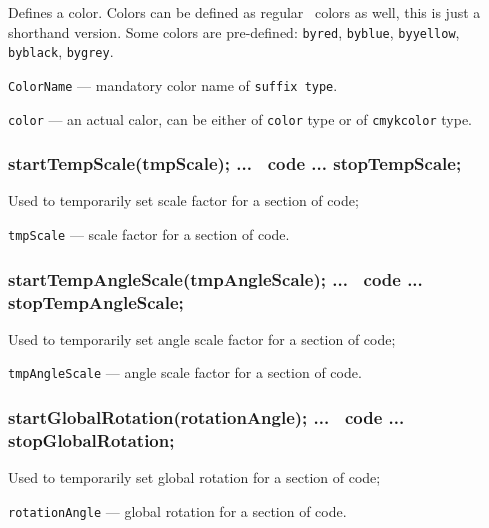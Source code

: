 \documentclass{ltxdoc}
\begin{document}
	Defines a color. Colors can be defined as regular \METAPOST\ colors as well, this is just a shorthand version. Some colors are pre-defined: \texttt{byred}, \texttt{byblue}, \texttt{byyellow}, \texttt{byblack}, \texttt{bygrey}.

	\texttt{ColorName} — mandatory color name of \texttt{suffix type}.
	
	\texttt{color} — an actual calor, can be either of \texttt{color} type or of \texttt{cmykcolor} type.

	

	

\subsubsection{startTempScale(tmpScale); ... \METAPOST\ code ... stopTempScale;}\label{startTempScale}

	Used to temporarily set scale factor for a section of code;

	\texttt{tmpScale} — scale factor for a section of code.
		
\subsubsection{startTempAngleScale(tmpAngleScale); ... \METAPOST\ code ... stopTempAngleScale;}\label{startTempAngleScale}

	Used to temporarily set angle scale factor for a section of code;

	\texttt{tmpAngleScale} — angle scale factor for a section of code.

\subsubsection{startGlobalRotation(rotationAngle); ... \METAPOST\ code ... stopGlobalRotation;}\label{startGlobalRotation}

	Used to temporarily set global rotation for a section of code;

	\texttt{rotationAngle} — global rotation for a section of code.
	
\end{document}
